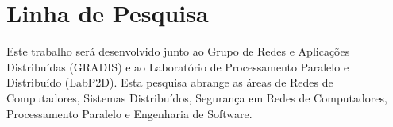 \section{Linha de Pesquisa}

Este trabalho será desenvolvido junto ao Grupo de Redes e Aplicações Distribuídas (GRADIS) e ao Laboratório de Processamento Paralelo e Distribuído (LabP2D). 
%
Esta pesquisa abrange as áreas de Redes de Computadores, Sistemas Distribuídos, Segurança em Redes de Computadores, Processamento Paralelo e Engenharia de Software.
